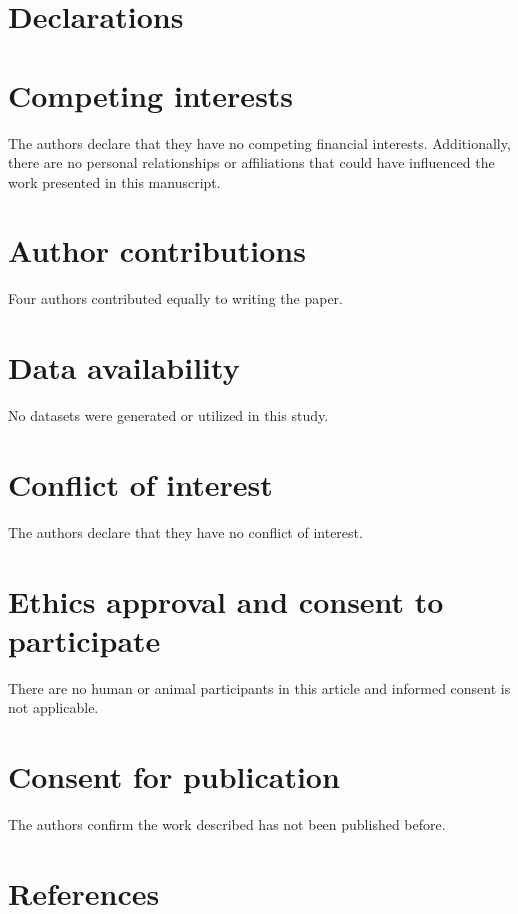 \documentclass{article}
\theoremstyle{plain}
\theoremstyle{definition}
\begin{document}
\section*{Declarations}

\section*{Competing interests}
The authors declare that they have no competing financial interests. Additionally, there are no personal relationships or affiliations that could have influenced the work presented in this manuscript.

\section*{Author contributions}
Four authors contributed equally to writing the paper.

\section*{Data availability}
No datasets were generated or utilized in this study.

\section*{Conflict of interest}
The authors declare that they have no conflict of interest.

\section*{Ethics approval and consent to participate}
There are no human or animal participants in this article and informed consent is not applicable.

\section*{Consent for publication}
The authors confirm the work described has not been published before.


\section*{References}
 
\end{document}
